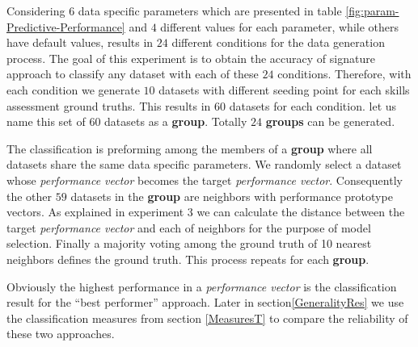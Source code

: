 Considering $6$ data specific parameters which are presented in table \ref{fig:param-Predictive-Performance} and $4$ different values for each parameter, while others have default values, results in $24$ different conditions for the data generation process. The goal of this experiment is to obtain the accuracy of signature approach to classify any dataset with each of these $24$ conditions. Therefore, with each condition we generate $10$ datasets with different seeding point for each skills assessment ground truths. This results in $60$ datasets for each condition. let us name this set of $60$ datasets as a \textbf{group}. Totally $24$ \textbf{groups} can be generated.

The classification is preforming among the members of a \textbf{group} where all datasets share the same data specific parameters. We randomly select a dataset whose \textit{performance vector} becomes the target \textit{performance vector}. Consequently the other $59$ datasets in the \textbf{group} are neighbors with performance prototype vectors. As explained in experiment 3 we can calculate the distance between the target \textit{performance vector} and each of neighbors for the purpose of model selection. Finally a majority voting among the ground truth of 10 nearest neighbors defines the ground truth. This process repeats for each \textbf{group}.

Obviously the highest performance in a \textit{performance vector} is the classification result for the ``best performer'' approach. Later in section\ref{GeneralityRes} we use the classification measures from section \ref{MeasuresT} to compare the reliability of these two approaches.
